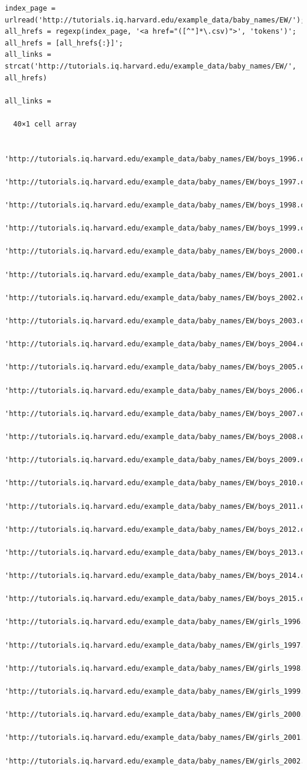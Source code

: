 \documentclass[
]{book}
\begin{document}
\begin{verbatim}
index_page = urlread('http://tutorials.iq.harvard.edu/example_data/baby_names/EW/');
all_hrefs = regexp(index_page, '<a href="([^"]*\.csv)">', 'tokens')';
all_hrefs = [all_hrefs{:}]';
all_links = strcat('http://tutorials.iq.harvard.edu/example_data/baby_names/EW/', all_hrefs)

all_links =

  40×1 cell array

    'http://tutorials.iq.harvard.edu/example_data/baby_names/EW/boys_1996.csv'
    'http://tutorials.iq.harvard.edu/example_data/baby_names/EW/boys_1997.csv'
    'http://tutorials.iq.harvard.edu/example_data/baby_names/EW/boys_1998.csv'
    'http://tutorials.iq.harvard.edu/example_data/baby_names/EW/boys_1999.csv'
    'http://tutorials.iq.harvard.edu/example_data/baby_names/EW/boys_2000.csv'
    'http://tutorials.iq.harvard.edu/example_data/baby_names/EW/boys_2001.csv'
    'http://tutorials.iq.harvard.edu/example_data/baby_names/EW/boys_2002.csv'
    'http://tutorials.iq.harvard.edu/example_data/baby_names/EW/boys_2003.csv'
    'http://tutorials.iq.harvard.edu/example_data/baby_names/EW/boys_2004.csv'
    'http://tutorials.iq.harvard.edu/example_data/baby_names/EW/boys_2005.csv'
    'http://tutorials.iq.harvard.edu/example_data/baby_names/EW/boys_2006.csv'
    'http://tutorials.iq.harvard.edu/example_data/baby_names/EW/boys_2007.csv'
    'http://tutorials.iq.harvard.edu/example_data/baby_names/EW/boys_2008.csv'
    'http://tutorials.iq.harvard.edu/example_data/baby_names/EW/boys_2009.csv'
    'http://tutorials.iq.harvard.edu/example_data/baby_names/EW/boys_2010.csv'
    'http://tutorials.iq.harvard.edu/example_data/baby_names/EW/boys_2011.csv'
    'http://tutorials.iq.harvard.edu/example_data/baby_names/EW/boys_2012.csv'
    'http://tutorials.iq.harvard.edu/example_data/baby_names/EW/boys_2013.csv'
    'http://tutorials.iq.harvard.edu/example_data/baby_names/EW/boys_2014.csv'
    'http://tutorials.iq.harvard.edu/example_data/baby_names/EW/boys_2015.csv'
    'http://tutorials.iq.harvard.edu/example_data/baby_names/EW/girls_1996.csv'
    'http://tutorials.iq.harvard.edu/example_data/baby_names/EW/girls_1997.csv'
    'http://tutorials.iq.harvard.edu/example_data/baby_names/EW/girls_1998.csv'
    'http://tutorials.iq.harvard.edu/example_data/baby_names/EW/girls_1999.csv'
    'http://tutorials.iq.harvard.edu/example_data/baby_names/EW/girls_2000.csv'
    'http://tutorials.iq.harvard.edu/example_data/baby_names/EW/girls_2001.csv'
    'http://tutorials.iq.harvard.edu/example_data/baby_names/EW/girls_2002.csv'

\end{verbatim}
\end{document}
